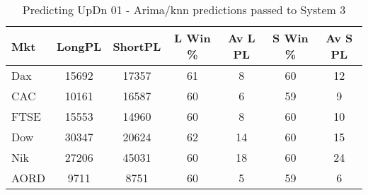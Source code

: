 \begin{table}[ht]
\centering
\caption[Predicting UpDn 01 - Arima/knn predictions passed to System 3.]{Predicting UpDn 01 - Arima/knn predictions passed to System 3} 
\label{tab:chp_ts:pUD_01_arima_knn_sys}
\begin{tabular}{lcccccc}
  \toprule Mkt & LongPL & ShortPL & L Win \% & Av L PL & S Win \% & Av S PL \\ 
  \midrule Dax & 15692 & 17357 & 61 & 8 & 60 & 12 \\ 
  CAC & 10161 & 16587 & 60 & 6 & 59 & 9 \\ 
  FTSE & 15553 & 14960 & 60 & 8 & 60 & 10 \\ 
  Dow & 30347 & 20624 & 62 & 14 & 60 & 15 \\ 
  Nik & 27206 & 45031 & 60 & 18 & 60 & 24 \\ 
  AORD & 9711 & 8751 & 60 & 5 & 59 & 6 \\ 
   \bottomrule \end{tabular}
\end{table}
